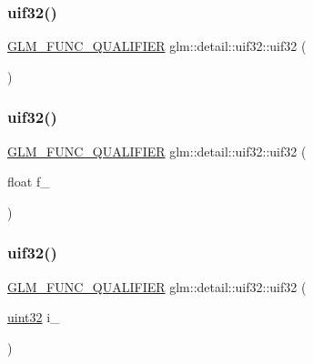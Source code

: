 \subsubsection{\texorpdfstring{uif32()}{uif32()}\hspace{0.1cm}{\footnotesize\ttfamily [1/3]}}
{\footnotesize\ttfamily \hyperlink{setup_8hpp_a33fdea6f91c5f834105f7415e2a64407}{G\+L\+M\+\_\+\+F\+U\+N\+C\+\_\+\+Q\+U\+A\+L\+I\+F\+I\+ER} glm\+::detail\+::uif32\+::uif32 (\begin{DoxyParamCaption}{ }\end{DoxyParamCaption})\hspace{0.3cm}{\ttfamily [inline]}}

\mbox{\label{unionglm_1_1detail_1_1uif32_a0d6e08c93b3d52c01e45864ff689c426}} 
\subsubsection{\texorpdfstring{uif32()}{uif32()}\hspace{0.1cm}{\footnotesize\ttfamily [2/3]}}
{\footnotesize\ttfamily \hyperlink{setup_8hpp_a33fdea6f91c5f834105f7415e2a64407}{G\+L\+M\+\_\+\+F\+U\+N\+C\+\_\+\+Q\+U\+A\+L\+I\+F\+I\+ER} glm\+::detail\+::uif32\+::uif32 (\begin{DoxyParamCaption}\item[{float}]{f\+\_\+ }\end{DoxyParamCaption})\hspace{0.3cm}{\ttfamily [inline]}}

\mbox{\label{unionglm_1_1detail_1_1uif32_aee424b46f48baa812572c015ec8bf434}} 
\subsubsection{\texorpdfstring{uif32()}{uif32()}\hspace{0.1cm}{\footnotesize\ttfamily [3/3]}}
{\footnotesize\ttfamily \hyperlink{setup_8hpp_a33fdea6f91c5f834105f7415e2a64407}{G\+L\+M\+\_\+\+F\+U\+N\+C\+\_\+\+Q\+U\+A\+L\+I\+F\+I\+ER} glm\+::detail\+::uif32\+::uif32 (\begin{DoxyParamCaption}\item[{\hyperlink{namespaceglm_1_1detail_ade6cfbf377022aaa391af8cd50489222}{uint32}}]{i\+\_\+ }\end{DoxyParamCaption})\hspace{0.3cm}{\ttfamily [inline]}}



